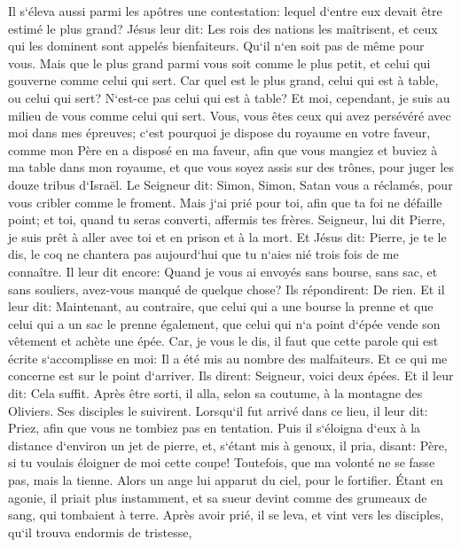 \verse Il s`éleva aussi parmi les apôtres une contestation: lequel d`entre eux devait être estimé le plus grand? 
\verse Jésus leur dit: Les rois des nations les maîtrisent, et ceux qui les dominent sont appelés bienfaiteurs. 
\verse Qu`il n`en soit pas de même pour vous. Mais que le plus grand parmi vous soit comme le plus petit, et celui qui gouverne comme celui qui sert. 
\verse Car quel est le plus grand, celui qui est à table, ou celui qui sert? N`est-ce pas celui qui est à table? Et moi, cependant, je suis au milieu de vous comme celui qui sert. 
\verse Vous, vous êtes ceux qui avez persévéré avec moi dans mes épreuves; 
\verse c`est pourquoi je dispose du royaume en votre faveur, comme mon Père en a disposé en ma faveur, 
\verse afin que vous mangiez et buviez à ma table dans mon royaume, et que vous soyez assis sur des trônes, pour juger les douze tribus d`Israël. 
\verse Le Seigneur dit: Simon, Simon, Satan vous a réclamés, pour vous cribler comme le froment. 
\verse Mais j`ai prié pour toi, afin que ta foi ne défaille point; et toi, quand tu seras converti, affermis tes frères. 
\verse Seigneur, lui dit Pierre, je suis prêt à aller avec toi et en prison et à la mort. 
\verse Et Jésus dit: Pierre, je te le dis, le coq ne chantera pas aujourd`hui que tu n`aies nié trois fois de me connaître. 
\verse Il leur dit encore: Quand je vous ai envoyés sans bourse, sans sac, et sans souliers, avez-vous manqué de quelque chose? Ils répondirent: De rien. 
\verse Et il leur dit: Maintenant, au contraire, que celui qui a une bourse la prenne et que celui qui a un sac le prenne également, que celui qui n`a point d`épée vende son vêtement et achète une épée. 
\verse Car, je vous le dis, il faut que cette parole qui est écrite s`accomplisse en moi: Il a été mis au nombre des malfaiteurs. Et ce qui me concerne est sur le point d`arriver. 
\verse Ils dirent: Seigneur, voici deux épées. Et il leur dit: Cela suffit. 
\verse Après être sorti, il alla, selon sa coutume, à la montagne des Oliviers. Ses disciples le suivirent. 
\verse Lorsqu`il fut arrivé dans ce lieu, il leur dit: Priez, afin que vous ne tombiez pas en tentation. 
\verse Puis il s`éloigna d`eux à la distance d`environ un jet de pierre, et, s`étant mis à genoux, il pria, 
\verse disant: Père, si tu voulais éloigner de moi cette coupe! Toutefois, que ma volonté ne se fasse pas, mais la tienne. 
\verse Alors un ange lui apparut du ciel, pour le fortifier. 
\verse Étant en agonie, il priait plus instamment, et sa sueur devint comme des grumeaux de sang, qui tombaient à terre. 
\verse Après avoir prié, il se leva, et vint vers les disciples, qu`il trouva endormis de tristesse, 
